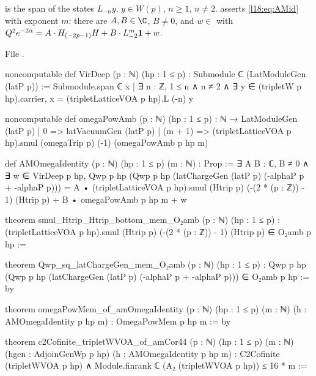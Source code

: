 \begin{definition}\label{l18:def:AMid}
 is the span of the states $L_{-n}y$, $y\in W(p)$, $n\ge1$, $n\ne2$.
 asserts \eqref{l18:eq:AMid} with exponent $m$: there are $A,B\in\C$, $B\ne0$,
and $w\in$  with $Q^2e^{-2\alpha}=A\cdot H_{(-2p-1)}H+B\cdot L_{-2}^m\mathbf{1}+w$.
\end{definition}
\noindent File .
\begin{leancode}
noncomputable def VirDeep (p : ℕ) (hp : 1 ≤ p) : Submodule ℂ (LatModuleGen (latP p)) :=
  Submodule.span ℂ {x | ∃ n : ℤ, 1 ≤ n ∧ n ≠ 2 ∧ ∃ y ∈ (tripletW p hp).carrier,
    x = (tripletLatticeVOA p hp).L (-n) y}

noncomputable def omegaPowAmb (p : ℕ) (hp : 1 ≤ p) : ℕ → LatModuleGen (latP p)
  | 0 => latVacuumGen (latP p)
  | (m + 1) => (tripletLatticeVOA p hp).smul (omegaTrip p) (-1) (omegaPowAmb p hp m)

def AMOmegaIdentity (p : ℕ) (hp : 1 ≤ p) (m : ℕ) : Prop :=
  ∃ A B : ℂ, B ≠ 0 ∧ ∃ w ∈ VirDeep p hp,
    Qwp p hp (Qwp p hp (latChargeGen (latP p) (-alphaP p + -alphaP p)))
      = A • (tripletLatticeVOA p hp).smul (Htrip p) (-(2 * (p : ℤ)) - 1) (Htrip p)
        + B • omegaPowAmb p hp m + w
\end{leancode}
\begin{leancode}
theorem smul_Htrip_Htrip_bottom_mem_O₂amb (p : ℕ) (hp : 1 ≤ p) :
    (tripletLatticeVOA p hp).smul (Htrip p) (-(2 * (p : ℤ)) - 1) (Htrip p) ∈ O₂amb p hp :=

theorem Qwp_sq_latChargeGen_mem_O₂amb (p : ℕ) (hp : 1 ≤ p) :
    Qwp p hp (Qwp p hp (latChargeGen (latP p) (-alphaP p + -alphaP p))) ∈ O₂amb p hp := by

theorem omegaPowMem_of_amOmegaIdentity (p : ℕ) (hp : 1 ≤ p) (m : ℕ) (h : AMOmegaIdentity p hp m) :
    OmegaPowMem p hp m := by

theorem c2Cofinite_tripletWVOA_of_amCor44 (p : ℕ) (hp : 1 ≤ p) (m : ℕ)
    (hgen : AdjoinGenWp p hp) (h : AMOmegaIdentity p hp m) :
    C2Cofinite (tripletWVOA p hp)
      ∧ Module.finrank ℂ (A₂ (tripletWVOA p hp)) ≤ 16 * m :=
\end{leancode}
